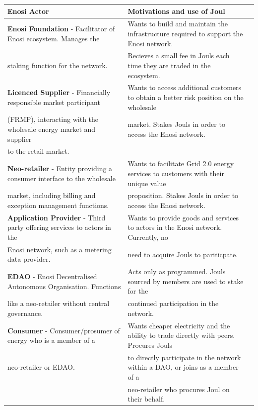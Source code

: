 \documentclass[a4paper,12pt,reqno]{amsart}
\theoremstyle{definition}
\begin{document}
\begin{landscape}
\begin{center}
\begin{tabular}{|l|l|l|}
 \hline 	
\textbf{Enosi Actor} & \textbf{Motivations and use of Joul}\\
 \hline 
 \hline
 \textbf{Enosi Foundation} - Facilitator of Enosi ecosystem. Manages the 	 	& Wants to build and maintain the infrastructure required to support the Enosi network.			\\
 staking function for the network.	 	&  Recieves a small fee in Jouls each time they are traded in the ecosystem. 		\\
 \hline 
  \textbf{Licenced Supplier} - Financially responsible market participant 		& Wants to access additional customers to obtain a better risk position on the wholesale		\\
   (FRMP), interacting with the wholesale energy market and supplier  	& 	 market. Stakes Jouls in order to access the Enosi network.		\\
	to the retail market.		& 		\\
 \hline 
  \textbf{Neo-retailer} - Entity providing a consumer interface to the wholesale	& Wants to facilitate Grid 2.0 energy services to customers with their unique value  	\\
  market, including billing and exception management functions. 		&   proposition. Stakes Jouls in order to access the Enosi network.			\\
 \hline 
 \textbf{Application Provider} - Third party offering services to actors in	the & Wants to provide goods and services to  actors in the Enosi network. Currently, no  		\\
   Enosi  network, such as a metering data provider.				& need to acquire Jouls to pariticpate. \\
 \hline
 \textbf{EDAO} - Enosi Decentralised Autonomous Organisation. Functions			& Acts only as programmed. Jouls sourced by	members are used to stake for the	\\
like a neo-retailer	without central governance. 	&  continued participation in the network.	\\
 \hline
\textbf{Consumer} - Consumer/prosumer of  energy who is a member of a 	 		& Wants cheaper electricity and the ability to trade directly with peers. Procures Jouls 	\\
neo-retailer or EDAO.		& to directly participate in the network within a DAO, or joins as a member of a 	\\
  								&  neo-retailer who procures Joul on their behalf. 		\\
 \hline
\end{tabular}
\end{center}
\vspace{+1em}
\label{tab}
\end{landscape}
\end{document}
